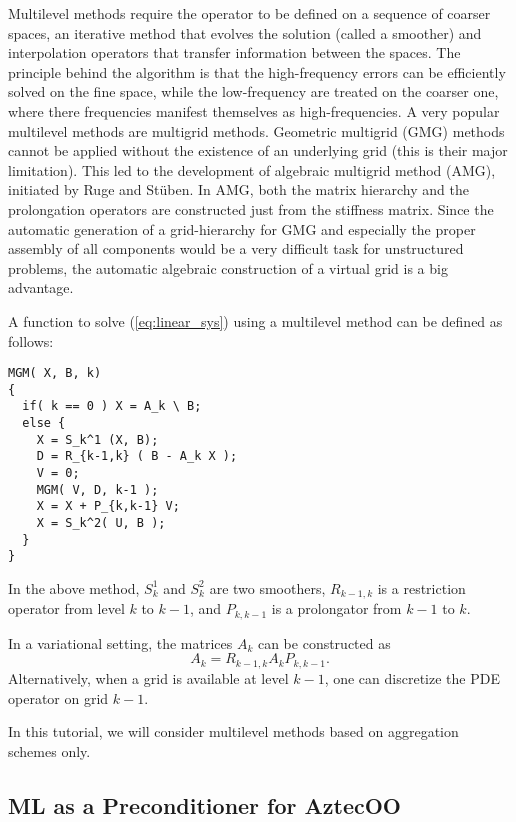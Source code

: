 \medskip

Multilevel methods require the operator to be defined on a sequence of
coarser spaces, an iterative method that evolves the solution (called a
smoother) and interpolation operators that transfer information between
the spaces. The principle behind the algorithm is that the
high-frequency errors can be efficiently solved on the fine space, while
the low-frequency are treated on the coarser one, where there
frequencies manifest themselves as high-frequencies. A very popular
multilevel methods are multigrid methods.  Geometric multigrid (GMG)
methods cannot be applied without the existence of an underlying grid
(this is their major limitation). This led to the development of
algebraic multigrid method (AMG), initiated by Ruge and St\"uben.  In
AMG, both the matrix hierarchy and the prolongation operators are
constructed just from the stiffness matrix.  Since the automatic
generation of a grid-hierarchy for GMG and especially the proper
assembly of all components would be a very difficult task for
unstructured problems, the automatic algebraic construction of a virtual
grid is a big advantage.

A function to solve (\ref{eq:linear_sys}) using a multilevel method can
be defined as follows:
\begin{verbatim}
MGM( X, B, k)
{
  if( k == 0 ) X = A_k \ B;
  else {
    X = S_k^1 (X, B);
    D = R_{k-1,k} ( B - A_k X );
    V = 0;
    MGM( V, D, k-1 );
    X = X + P_{k,k-1} V;
    X = S_k^2( U, B );
  }
}
\end{verbatim}
In the above method, $S_k^1$ and $S_k^2$ are two smoothers, $R_{k-1,k}$
is a restriction operator from level $k$ to $k-1$, and $P_{k,k-1}$ is a
prolongator from $k-1$ to $k$.

In a variational setting, the matrices $A_k$ can be constructed as
\[
A_k = R_{k-1,k} A_k P_{k,k-1}.
\]
Alternatively, when a grid is available at level $k-1$, one can
discretize the PDE operator on grid $k-1$.

\begin{remark}
  In this tutorial, we will consider multilevel methods based on
  aggregation schemes only.
\end{remark}


\subsection{ML as a Preconditioner for AztecOO}
\label{sec:ml_prec}

